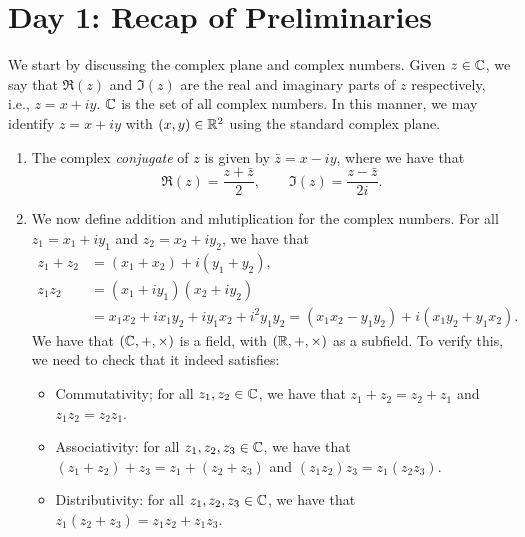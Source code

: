 \section{Day 1: Recap of Preliminaries}
We start by discussing the complex plane and complex numbers. Given $z \in \mathbb C$, we say that $\Re(z)$ and $\Im(z)$ are the real and imaginary parts of $z$ respectively, i.e., $z = x + iy$. $\mathbb C$ is the set of all complex numbers. In this manner, we may identify $z = x + iy$ with $(x, y) \in \mathbb R^2$ using the standard complex plane.
\begin{enumerate}[label=(\alph*)]
    \item The complex \textit{conjugate} of $z$ is given by $\bar{z} = x - iy$, where we have that
    \[ \Re(z) = \frac{z + \bar{z}}{2}, \qquad \Im(z) = \frac{z - \bar{z}}{2i}. \]

    \item We now define addition and mlutiplication for the complex numbers. For all $z_1 = x_1 + i y_1$ and $z_2 = x_2 + i y_2$, we have that
    \begin{align*}
        z_1 + z_2 &= (x_1 + x_2) + i (y_1 + y_2), \\
        z_1 z_2 &= (x_1 + iy_1) (x_2 + iy_2) \\
        &= x_1x_2 + ix_1y_2 + iy_1x_2 + i^2 y_1y_2 = (x_1x_2 - y_1y_2) + i(x_1y_2 + y_1x_2).
    \end{align*}
    We have that $(\mathbb C, +, \times)$ is a field, with $(\mathbb R, +, \times)$ as a subfield. To verify this, we need to check that it indeed satisfies:
    \begin{itemize}
        \item Commutativity; for all $z_1, z_2 \in \mathbb C$, we have that $z_1 + z_2 = z_2 + z_1$ and $z_1z_2 = z_2z_1$.
        \item Associativity: for all $z_1, z_2, z_3 \in \mathbb C$, we have that $(z_1 + z_2) + z_3 = z_1 + (z_2 + z_3)$ and $(z_1z_2)z_3 = z_1(z_2z_3)$.
        \item Distributivity: for all $z_1, z_2, z_3 \in \mathbb C$, we have that $z_1(z_2 + z_3) = z_1z_2 + z_1z_3$.
    \end{itemize}


\end{enumerate}
